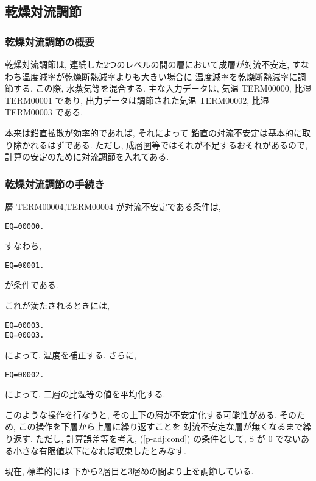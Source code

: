 ﻿
\subsection{乾燥対流調節}

\subsubsection{乾燥対流調節の概要}

乾燥対流調節は, 
連続した2つのレベルの間の層において成層が対流不安定, 
すなわち温度減率が乾燥断熱減率よりも大きい場合に
温度減率を乾燥断熱減率に調節する. この際, 水蒸気等を混合する.
主な入力データは, 気温 TERM00000, 比湿 TERM00001 であり,
出力データは調節された気温 TERM00002, 比湿 TERM00003 である.

本来は鉛直拡散が効率的であれば, それによって
鉛直の対流不安定は基本的に取り除かれるはずである.
ただし, 成層圏等ではそれが不足するおそれがあるので,
計算の安定のために対流調節を入れてある.

\subsubsection{乾燥対流調節の手続き}

層 TERM00004,TERM00004 が対流不安定である条件は,
%
\begin{verbatim}
EQ=00000.
\end{verbatim}
%
すなわち,
\begin{verbatim}
EQ=00001.
\end{verbatim}
が条件である.

これが満たされるときには,
\begin{verbatim}
EQ=00003.
EQ=00003.
\end{verbatim}
によって, 温度を補正する.
さらに,
\begin{verbatim}
EQ=00002.
\end{verbatim}
によって, 二層の比湿等の値を平均化する.

このような操作を行なうと,
その上下の層が不安定化する可能性がある. そのため,
この操作を下層から上層に繰り返すことを
対流不安定な層が無くなるまで繰り返す.
ただし, 計算誤差等を考え, 
(\ref{p-adj:cond}) の条件として,
S が 0 でないある小さな有限値以下になれば収束したとみなす.

現在, 標準的には 下から2層目と3層めの間より上を調節している.

